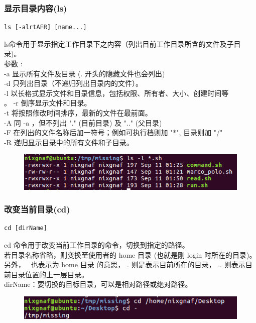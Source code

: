 \documentclass{article}
\begin{document}
\subsubsection{显示目录内容(ls)}
\begin{lstlisting}[style=myStyle]
 ls [-alrtAFR] [name...]
\end{lstlisting}
ls命令用于显示指定工作目录下之内容（列出目前工作目录所含的文件及子目录)。\\
参数 :\\
-a 显示所有文件及目录 (. 开头的隐藏文件也会列出)\\
-d 只列出目录（不递归列出目录内的文件）。\\
-l 以长格式显示文件和目录信息，包括权限、所有者、大小、创建时间等\\。
-r 倒序显示文件和目录。\\
-t 将按照修改时间排序，最新的文件在最前面。\\
-A 同 -a ，但不列出 "." (目前目录) 及 ".." (父目录)\\
-F 在列出的文件名称后加一符号；例如可执行档则加 "*", 目录则加 "/"\\
-R 递归显示目录中的所有文件和子目录。
\begin{figure}[h]
    \centering
    \includegraphics[width=0.5\linewidth]{image11.png}
\end{figure}

\subsubsection{改变当前目录(cd)}
\begin{lstlisting}[style=myStyle]
cd [dirName]
\end{lstlisting}
cd 命令用于改变当前工作目录的命令，切换到指定的路径。\\
若目录名称省略，则变换至使用者的 home 目录 (也就是刚 login 时所在的目录)。\\
另外，~ 也表示为 home 目录 的意思， . 则是表示目前所在的目录， .. 则表示目前目录位置的上一层目录。\\
dirName：要切换的目标目录，可以是相对路径或绝对路径。
\begin{figure}[h]
    \centering
    \includegraphics[width=0.5\linewidth]{image12.png}
\end{figure}
\end{document}
